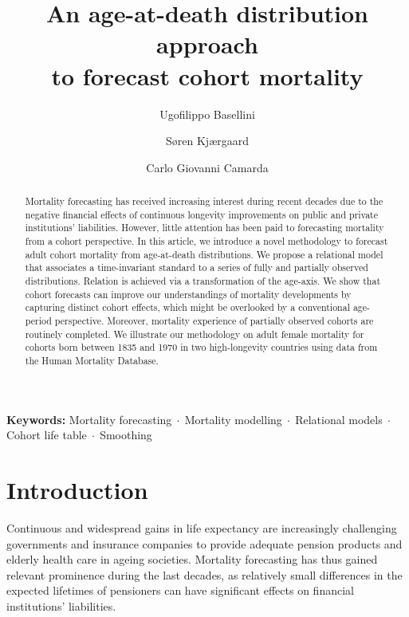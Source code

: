 \documentclass[11pt, a4paper]{article}
\begin{document}
	
	
	\title{An age-at-death distribution approach \\ to forecast cohort mortality}	
	
	\author[1,2]{Ugofilippo Basellini}
	\author[2]{S{\o}ren Kj{\ae}rgaard}
	\author[1]{Carlo Giovanni Camarda}
	
	\maketitle 
 
\begin{abstract}

Mortality forecasting has received increasing interest during recent decades due to the negative financial effects of continuous longevity improvements on public and private institutions' liabilities. However, little attention has been paid to forecasting mortality from a cohort perspective. In this article, we introduce a novel methodology to forecast adult cohort mortality from age-at-death distributions. We propose a relational model that associates a time-invariant standard to a series of fully and partially observed distributions. Relation is achieved via a transformation of the age-axis. We show that cohort forecasts can improve our understandings of mortality developments by capturing distinct cohort effects, which might be overlooked by a conventional age-period perspective. Moreover, mortality experience of partially observed cohorts are routinely completed. We illustrate our methodology on adult female mortality for cohorts born between 1835 and 1970 in two high-longevity countries using data from the Human Mortality Database.

\end{abstract}

\noindent \textbf{Keywords:} Mortality forecasting$\;\cdot\;$Mortality modelling$\;\cdot\;$Relational models$\;\cdot\;$Cohort life table$\;\cdot\;$Smoothing	

\section{Introduction}
\label{Sec:Intro}	
Continuous and widespread gains in life expectancy \citep{riley2001rising,oeppen2002broken} are increasingly challenging governments and insurance companies to provide adequate pension products and elderly health care in ageing societies. Mortality forecasting has thus gained relevant prominence during the last decades, as relatively small differences in the expected lifetimes of pensioners can have significant effects on financial institutions' liabilities.
\end{document}
